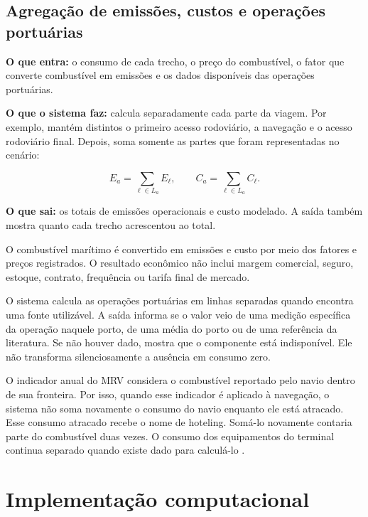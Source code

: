 \documentclass[12pt,a4paper]{article}
\begin{document}
\subsection{Agregação de emissões, custos e operações portuárias}
\label{subsec:agregacao}

\textbf{O que entra:} o consumo de cada trecho, o preço do combustível, o fator que converte combustível em emissões e os dados disponíveis das operações portuárias.

\textbf{O que o sistema faz:} calcula separadamente cada parte da viagem. Por exemplo, mantém distintos o primeiro acesso rodoviário, a navegação e o acesso rodoviário final. Depois, soma somente as partes que foram representadas no cenário:

\begin{equation}
E_a=\sum_{\ell\in L_a}E_{\ell},
\qquad
C_a=\sum_{\ell\in L_a}C_{\ell}.
\label{eq:totais}
\end{equation}

\textbf{O que sai:} os totais de emissões operacionais e custo modelado. A saída também mostra quanto cada trecho acrescentou ao total.

O combustível marítimo é convertido em emissões e custo por meio dos fatores e preços registrados. O resultado econômico não inclui margem comercial, seguro, estoque, contrato, frequência ou tarifa final de mercado.

O sistema calcula as operações portuárias em linhas separadas quando encontra uma fonte utilizável. A saída informa se o valor veio de uma medição específica da operação naquele porto, de uma média do porto ou de uma referência da literatura. Se não houver dado, mostra que o componente está indisponível. Ele não transforma silenciosamente a ausência em consumo zero.

O indicador anual do MRV considera o combustível reportado pelo navio dentro de sua fronteira. Por isso, quando esse indicador é aplicado à navegação, o sistema não soma novamente o consumo do navio enquanto ele está atracado. Esse consumo atracado recebe o nome de hoteling. Somá-lo novamente contaria parte do combustível duas vezes. O consumo dos equipamentos do terminal continua separado quando existe dado para calculá-lo \cite{berth2009,shipops2022}.

\section{Implementação computacional}
\label{sec:implementacao}
\end{document}
